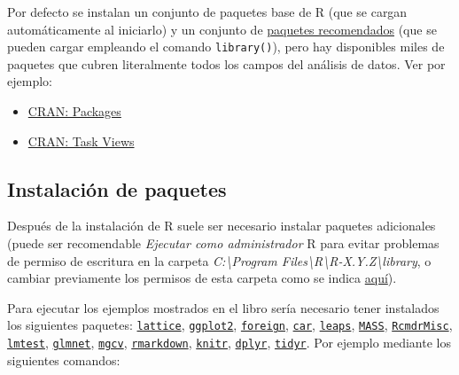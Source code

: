 \documentclass[
]{book}
\theoremstyle{break}
\theoremstyle{nonumberplain}
\begin{document}
Por defecto se instalan un conjunto de paquetes base de R (que se cargan automáticamente al iniciarlo) y un conjunto de \href{https://cran.r-project.org/src/contrib/4.1.2/Recommended}{paquetes recomendados} (que se pueden cargar empleando el comando \texttt{library()}),
pero hay disponibles miles de paquetes que cubren literalmente todos los campos del análisis de datos.
Ver por ejemplo:

\begin{itemize}
\item
  \href{https://cran.r-project.org/web/packages/index.html}{CRAN: Packages}
\item
  \href{https://cran.r-project.org/web/views}{CRAN: Task Views}
\end{itemize}

\hypertarget{paquetes-win}{%
\subsection{Instalación de paquetes}\label{paquetes-win}}

Después de la instalación de R suele ser necesario instalar paquetes adicionales (puede ser recomendable \emph{Ejecutar como administrador} R para evitar problemas de permiso de escritura en la carpeta \emph{C:\textbackslash Program Files\textbackslash R\textbackslash R-X.Y.Z\textbackslash library}, o cambiar previamente los permisos de esta carpeta como se indica \protect\hyperlink{library}{aquí}).

Para ejecutar los ejemplos mostrados en el libro sería necesario tener instalados los siguientes paquetes:
\href{https://CRAN.R-project.org/package=lattice}{\texttt{lattice}}, \href{https://CRAN.R-project.org/package=ggplot2}{\texttt{ggplot2}}, \href{https://CRAN.R-project.org/package=foreign}{\texttt{foreign}}, \href{https://CRAN.R-project.org/package=car}{\texttt{car}}, \href{https://CRAN.R-project.org/package=leaps}{\texttt{leaps}}, \href{https://CRAN.R-project.org/package=MASS}{\texttt{MASS}}, \href{https://CRAN.R-project.org/package=RcmdrMisc}{\texttt{RcmdrMisc}}, \href{https://CRAN.R-project.org/package=lmtest}{\texttt{lmtest}}, \href{https://CRAN.R-project.org/package=glmnet}{\texttt{glmnet}}, \href{https://CRAN.R-project.org/package=mgcv}{\texttt{mgcv}}, \href{https://CRAN.R-project.org/package=rmarkdown}{\texttt{rmarkdown}}, \href{https://CRAN.R-project.org/package=knitr}{\texttt{knitr}}, \href{https://CRAN.R-project.org/package=dplyr}{\texttt{dplyr}}, \href{https://CRAN.R-project.org/package=tidyr}{\texttt{tidyr}}.
Por ejemplo mediante los siguientes comandos:
\end{document}
